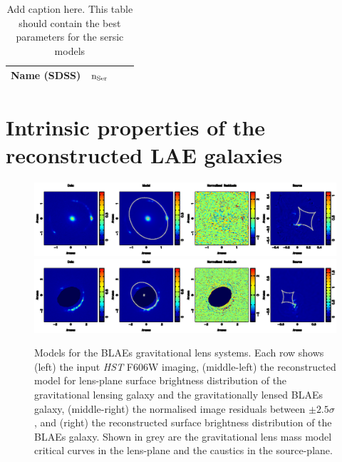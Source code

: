 \documentclass[a4paper,fleqn,usenatbib]{mnras}
\begin{document}
\begin{table}
\caption{Add caption here. This table should contain the best parameters for the sersic models}
\begin{tabular}{cccc}
\hline
 Name (SDSS) &$\rm{n_{Ser}}$\\
 \hline

 \hline
\end{tabular}
\label{tbl:sersic} 
\end{table}

\section{Intrinsic properties of the reconstructed LAE galaxies}
\label{sec:results}

%

\begin{figure}
\begin{center} 
\includegraphics[width = 16 cm]{fig1a.ps}
\includegraphics[width = 16 cm]{fig1c.ps}
\caption{Models for the BLAEs gravitational lens systems. Each row shows (left) the input {\it HST} F606W imaging, (middle-left) the reconstructed model for lens-plane surface brightness distribution of the gravitational lensing galaxy and the gravitationally lensed BLAEs galaxy, (middle-right) the normalised image residuals between $\pm2.5\sigma$, and (right) the reconstructed surface brightness distribution of the BLAEs galaxy. Shown in grey are the gravitational lens mass model critical curves in the lens-plane and the caustics in the source-plane.}
\label{fig:res_1}
\end{center}     
 \end{figure}
 
\end{document}
